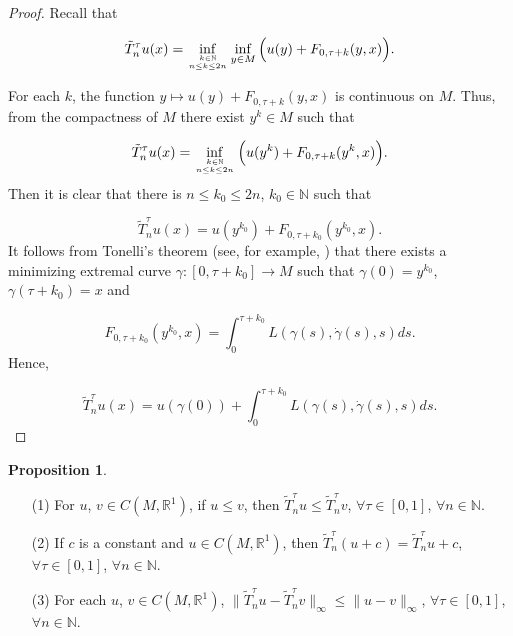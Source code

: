\documentclass{amsart}[12pt]
\theoremstyle{definition}
\newtheorem{proposition}[theorem]{Proposition}
\theoremstyle{remark}
\numberwithin{equation}{section}
\begin{document}
\begin{proof}
Recall that

\begin{align*}
\tilde{T}_n^\tau u(x)=\inf_{k\in\mathbb{N} \atop n\leq k\leq
                       2n}\inf_{y\in M}\Big(u(y)+F_{0,\tau+k}(y,x)\Big).
\end{align*}

For each $k$, the function $y\mapsto u(y)+F_{0,\tau+k}(y,x)$ is
continuous on $M$. Thus, from the compactness of $M$ there exist
$y^k\in M$ such that

\begin{align*}
\tilde{T}_n^\tau u(x)=\inf_{k\in\mathbb{N} \atop n\leq k\leq
                       2n}\Big(u(y^k)+F_{0,\tau+k}(y^k,x)\Big).
\end{align*}
Then it is clear that there is $n\leq k_0\leq2n$,
$k_0\in\mathbb{N}$ such that

\[
\tilde{T}_n^\tau u(x)=u(y^{k_0})+F_{0,\tau+k_0}(y^{k_0},x).
\]
It follows from Tonelli's theorem (see, for example, \cite{Mat91})
that there exists a minimizing extremal curve
$\gamma:[0,\tau+k_0]\to M$ such that $\gamma(0)=y^{k_0}$,
$\gamma(\tau+k_0)=x$ and

\[
F_{0,\tau+k_0}(y^{k_0},x)=\int_{0}^{\tau+k_0}
L(\gamma(s),\dot{\gamma}(s),s)ds.
\]
Hence,

\[
\tilde{T}_n^\tau u(x)=u(\gamma(0))+\int_{0}^{\tau+k_0}
L(\gamma(s),\dot{\gamma}(s),s)ds.
\]
\end{proof}

\begin{proposition}\label{pr3-3}
\noindent\begin{itemize}
    \item [(1)] For $u$, $v\in C(M,\mathbb{R}^1)$, if $u\leq
              v$, then $\tilde{T}_n^\tau u\leq\tilde{T}_n^\tau v$, $\forall
              \tau\in[0,1]$, $\forall n\in\mathbb{N}$.
    \item [(2)] If $c$ is a constant and $u\in C(M,\mathbb{R}^1)$,
              then $\tilde{T}_n^\tau(u+c)=\tilde{T}_n^\tau u+c$, $\forall
              \tau\in[0,1]$, $\forall n\in\mathbb{N}$.
    \item [(3)] For each $u$, $v\in C(M,\mathbb{R}^1)$,
              $\|\tilde{T}_n^\tau u-\tilde{T}_n^\tau
              v\|_\infty\leq\|u-v\|_\infty$, $\forall
              \tau\in[0,1]$, $\forall n\in\mathbb{N}$.
\end{itemize}
\end{proposition}
\end{document}
